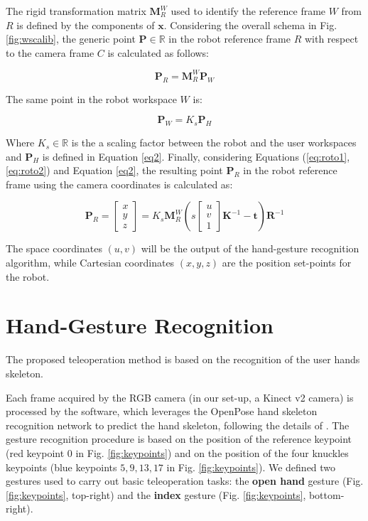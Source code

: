 \documentclass[letterpaper, 10 pt, conference]{ieeeconf}  %
\begin{document}
The rigid transformation matrix $\mathbf{M}^W_{R}$ used to identify the reference frame $W$ from $R$ is defined by the components of $\mathbf{x}$.
Considering the overall schema in Fig. \ref{fig:wscalib}, the generic point $\mathbf{P}\in\mathbb{R}$ in the robot reference frame $R$ with respect to the camera frame $C$ is calculated as follows:

\begin{equation}\label{eq:roto1}
\mathbf{P}_{R} = \mathbf{M}^W_{R}\mathbf{P}_{W}
\end{equation}

The same point in the robot workspace $W$ is:

\begin{equation}\label{eq:roto2}
\mathbf{P}_{W} = K_s\mathbf{P}_{H}
\end{equation}

Where $K_s\in \mathbb{R}$ is the a scaling factor between the robot and the user workspaces and $\mathbf{P}_{H}$ is defined in Equation \ref{eq2}. Finally, considering Equations (\ref{eq:roto1},\ref{eq:roto2}) and Equation \ref{eq2}, the resulting point $\mathbf{P}_R$ in the robot reference frame using the camera coordinates is calculated as:

\begin{equation}
\mathbf{P}_{R} = \begin{bmatrix}
x \\
y \\
z
\end{bmatrix}=
K_s\mathbf{M}^W_{R}
\left(s 
\begin{bmatrix}
u \\
v \\
1
\end{bmatrix}
\mathbf{K}^{-1}-\mathbf{t}\right)\mathbf{R}^{-1}
\end{equation}

The space coordinates $(u,v)$ will be the output of the hand-gesture recognition algorithm, while Cartesian coordinates $(x,y,z)$ are the position set-points for the robot.

\section{Hand-Gesture Recognition}\label{sec:HG_recon}
The proposed teleoperation method is based on the recognition of the user hands skeleton.

Each frame acquired by the RGB camera (in our set-up, a Kinect v2 camera) is processed by the software, which leverages the OpenPose hand skeleton recognition network to predict the hand skeleton, following the details of \cite{simon2017hand}.
The gesture recognition procedure is based on the position of the reference keypoint (red keypoint $0$ in Fig. \ref{fig:keypoints}) and on the position of the four knuckles keypoints (blue keypoints $5, 9, 13, 17$ in Fig. \ref{fig:keypoints}). We defined two gestures used to carry out basic teleoperation tasks: the \textbf{open hand} gesture (Fig. \ref{fig:keypoints}, top-right) and the \textbf{index} gesture (Fig. \ref{fig:keypoints}, bottom-right).
\end{document}
